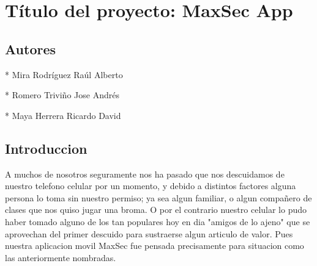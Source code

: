 \documentclass[12pt,letterpaper]{article}
\begin{document}
\section{Título del proyecto:  MaxSec App}
\subsection{Autores} 

	* Mira Rodríguez Raúl Alberto
	
	* Romero Triviño Jose Andrés
	
	* Maya Herrera Ricardo David

\subsection{Introduccion} 

A muchos de nosotros seguramente nos ha pasado que nos descuidamos de nuestro telefono celular por un momento, y debido a distintos factores alguna persona lo toma sin nuestro permiso; ya sea algun familiar, o algun compañero de clases que nos quiso jugar una broma. O por el contrario nuestro celular lo pudo haber tomado alguno de los tan populares hoy en dia "amigos de lo ajeno" que se aprovechan del primer descuido para sustraerse algun articulo de valor.
Pues nuestra aplicacion movil MaxSec fue pensada precisamente para situacion como las anteriormente nombradas.
\end{document}
